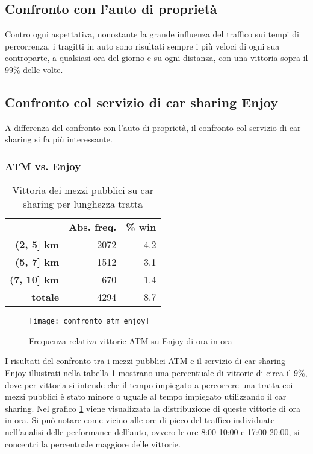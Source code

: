 \subsection{Confronto con l'auto di proprietà}

Contro ogni aspettativa, nonostante la grande influenza del traffico sui tempi di percorrenza, i tragitti in auto sono risultati sempre i più veloci di ogni sua controparte, a qualsiasi ora del giorno e su ogni distanza, con una vittoria sopra il 99\% delle volte.

\subsection{Confronto col servizio di car sharing Enjoy}

A differenza del confronto con l'auto di proprietà, il confronto col servizio di car sharing si fa più interessante.

\subsubsection{ATM vs. Enjoy}

\begin{table}[H]
	\centering

	\begin{tabular}{ | r r r | }
		\hline
		& \textbf{Abs. freq.} & \textbf{\% win} \\
		\textbf{(2, 5] km} & 2072 & 4.2 \\
		\textbf{(5, 7] km} & 1512 & 3.1 \\
		\textbf{(7, 10] km} & 670 & 1.4 \\
		\hline
		\textbf{totale} & 4294 & 8.7 \\
		\hline
	\end{tabular}

	\caption{Vittoria dei mezzi pubblici su car sharing per lunghezza tratta}
	\label{table:5}
\end{table}

\begin{figure}[H]
	\texttt{[image: confronto\_atm\_enjoy]}
	\caption{Frequenza relativa vittorie ATM su Enjoy di ora in ora}
	\label{image:10}
\end{figure}

I risultati del confronto tra i mezzi pubblici ATM e il servizio di car sharing Enjoy illustrati nella tabella \ref{table:5} mostrano una percentuale di vittorie di circa il 9\%, dove per vittoria si intende che il tempo impiegato a percorrere una tratta coi mezzi pubblici è stato minore o uguale al tempo impiegato utilizzando il car sharing. Nel grafico \ref{image:10} viene visualizzata la distribuzione di queste vittorie di ora in ora. Si può notare come vicino alle ore di picco del traffico individuate nell'analisi delle performance dell'auto, ovvero le ore 8:00-10:00 e 17:00-20:00, si concentri la percentuale maggiore delle vittorie.

